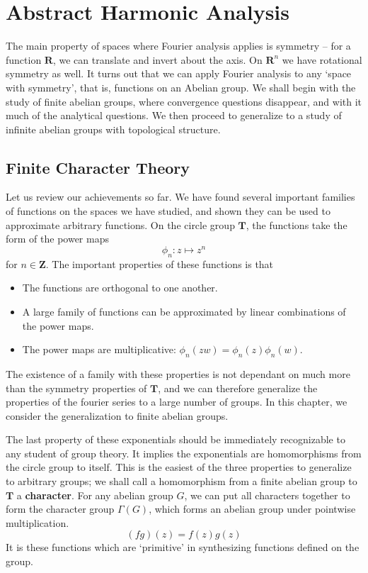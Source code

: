 
\part{Abstract Harmonic Analysis}

The main property of spaces where Fourier analysis applies is symmetry -- for a function $\mathbf{R}$, we can translate and invert about the axis. On $\mathbf{R}^n$ we have rotational symmetry as well. It turns out that we can apply Fourier analysis to any `space with symmetry', that is, functions on an Abelian group. We shall begin with the study of finite abelian groups, where convergence questions disappear, and with it much of the analytical questions. We then proceed to generalize to a study of infinite abelian groups with topological structure.


\chapter{Finite Character Theory}

Let us review our achievements so far. We have found several important families of functions on the spaces we have studied, and shown they can be used to approximate arbitrary functions. On the circle group $\mathbf{T}$, the functions take the form of the power maps
%
\[ \phi_n: z \mapsto z^n \]
%
for $n \in \mathbf{Z}$. The important properties of these functions is that
%
\begin{itemize}
    \item The functions are orthogonal to one another.
    \item A large family of functions can be approximated by linear combinations of the power maps.
    \item The power maps are multiplicative: $\phi_n(zw) = \phi_n(z) \phi_n(w)$.
\end{itemize}
%
The existence of a family with these properties is not dependant on much more than the symmetry properties of $\mathbf{T}$, and we can therefore generalize the properties of the fourier series to a large number of groups. In this chapter, we consider the generalization to finite abelian groups.

The last property of these exponentials should be immediately recognizable to any student of group theory. It implies the exponentials are homomorphisms from the circle group to itself. This is the easiest of the three properties to generalize to arbitrary groups; we shall call a homomorphism from a finite abelian group to $\mathbf{T}$ a {\bf character}. For any abelian group $G$, we can put all characters together to form the character group $\Gamma(G)$, which forms an abelian group under pointwise multiplication.
%
\[ (fg)(z) = f(z)g(z) \]
%
It is these functions which are `primitive' in synthesizing functions defined on the group.

